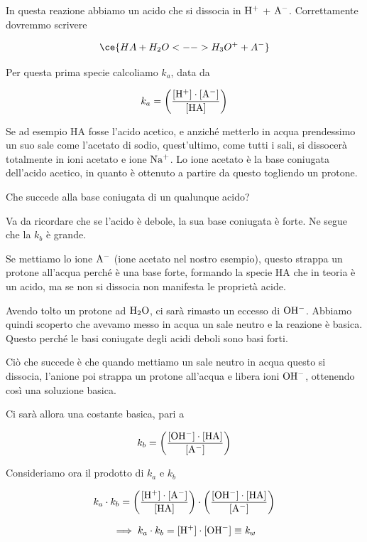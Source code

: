 
In questa reazione abbiamo un acido che si dissocia in $\rm H^+$ + $\rm A^-$. Correttamente dovremmo scrivere

$$\ce{HA + H_2O <--> H_3O^+ + A^-}$$

Per questa prima specie calcoliamo $k_a$, data da

$$k_a = \left( \rm \frac{[H^+] \cdot [A^-]}{[HA]} \right)$$

Se ad esempio HA fosse l'acido acetico, e anziché metterlo in acqua prendessimo un suo sale come l'acetato di sodio, quest'ultimo, come tutti i sali, si dissocerà totalmente in ioni acetato e ione $\rm Na^+$. Lo ione acetato è la base coniugata dell'acido acetico, in quanto è ottenuto a partire da questo togliendo un protone.

Che succede alla base coniugata di un qualunque acido?

Va da ricordare che se l'acido è debole, la sua base coniugata è forte. Ne segue che la $k_b$ è grande.

\vspace{0.2cm}

\vspace{0.2cm}Se mettiamo lo ione $\rm A^-$ (ione acetato nel nostro esempio), questo strappa un protone all'acqua perché è una base forte, formando la specie HA che in teoria è un acido, ma se non si dissocia non manifesta le proprietà acide.

Avendo tolto un protone ad $\rm H_2O$, ci sarà rimasto un eccesso di $\rm OH^-$. Abbiamo quindi scoperto che avevamo messo in acqua un sale neutro e la reazione è basica. Questo perché le basi coniugate degli acidi deboli sono basi forti.

Ciò che succede è che quando mettiamo un sale neutro in acqua questo si dissocia, l'anione poi strappa un protone all'acqua e libera ioni $\rm OH^-$, ottenendo così una soluzione basica.

Ci sarà allora una costante basica, pari a

$$k_b = \left( \rm \frac{[OH^-] \cdot [HA]}{[A^-]} \right)$$

Consideriamo ora il prodotto di $k_a$ e $k_b$

$$k_a \cdot k_b = \left( \rm \frac{[H^+] \cdot [A^-]}{[HA]} \right) \cdot \left( \rm \frac{[OH^-] \cdot [HA]}{[A^-]} \right)$$

$$\implies k_a \cdot k_b = \rm [H^+] \cdot [OH^-] \equiv \textit{k}_\textit{w}$$

